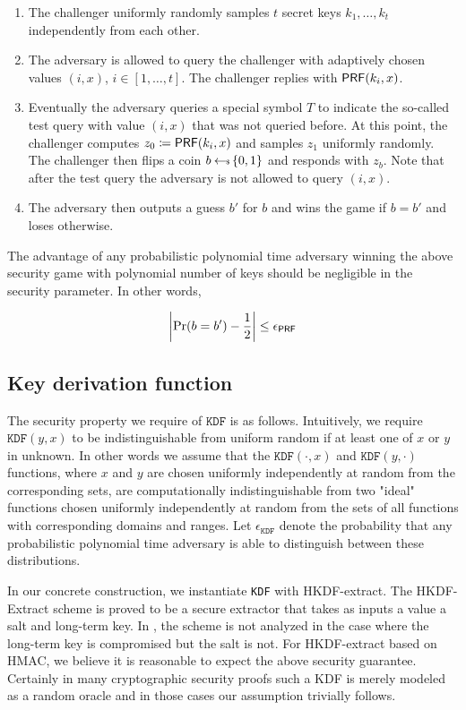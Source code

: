 \documentclass{article}
\begin{document}
\begin{enumerate}
\item The challenger uniformly randomly samples $t$ secret keys $k_1,\ldots,k_t$ independently from each other.

\item The adversary is allowed to query the challenger with adaptively chosen values $(i,x)$, $i \in [1,\ldots,t]$. The challenger replies with $\mathsf{PRF}(k_i, x)$.

\item Eventually the adversary queries a special symbol $T$ to indicate the so-called test query with value $(i,x)$ that was not queried before. At this point, the challenger computes $z_0 \coloneqq \mathsf{PRF}(k_i, x)$ and samples $z_1$ uniformly randomly. The challenger then flips a coin $b \hskip2.3pt{\gets\!\!\mbox{\tiny${\$}$\normalsize}}\, \{0, 1\}$ and responds with $z_b$. Note that after the test query the adversary is not allowed to query $(i,x)$.

\item The adversary then outputs a guess $b'$ for $b$ and wins the game if $b = b'$ and loses otherwise.
\end{enumerate}

The advantage of any probabilistic polynomial time adversary winning the above security game with polynomial number of keys should be negligible in the security parameter. In other words,

$$
\left \vert \Pr(b = b') - \frac{1}{2} \right \vert \le \epsilon_{\mathsf{PRF}}
$$

\subsection{Key derivation function} \label{KDFdef}
The security property we require of $\texttt{KDF}$ is as follows. Intuitively, we require $\texttt{KDF}(y,x)$ to be indistinguishable from uniform random if at least one of $x$ or $y$ in unknown. In other words we assume that the $\texttt{KDF}(\cdot,x)$ and $\texttt{KDF}(y,\cdot)$ functions, where $x$ and $y$ are chosen uniformly independently at random from the corresponding sets, are computationally indistinguishable from two "ideal" functions chosen uniformly independently at random from the sets of all functions with corresponding domains and ranges.  Let $\epsilon_{\texttt{KDF}}$ denote the probability that any probabilistic polynomial time adversary is able to distinguish between these distributions.

In our concrete construction, we instantiate \texttt{KDF} with HKDF-extract. The HKDF-Extract scheme is proved to be a secure extractor that takes as inputs a value a salt and long-term key. In \cite{krawczyk2010cryptographic}, the scheme is not analyzed in the case where the long-term key is compromised but the salt is not. For HKDF-extract based on HMAC, we believe it is reasonable to expect the above security guarantee. Certainly in many cryptographic security proofs such a KDF is merely modeled as a random oracle and in those cases our assumption trivially follows.
\end{document}
